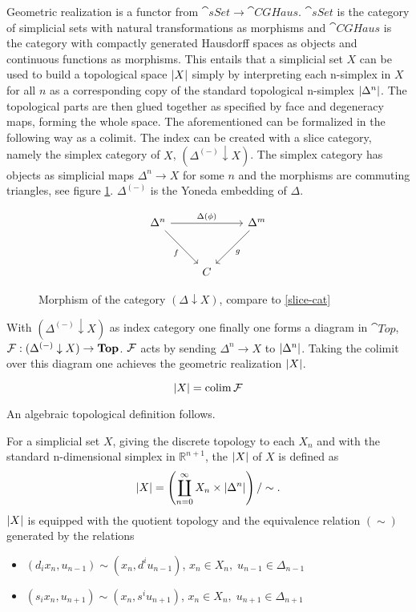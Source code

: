 \documentclass[../../main.tex]{subfiles}
\begin{document}
    Geometric realization is a functor from $\cat{sSet}\to \cat{CGHaus}$. $\cat{sSet}$ is the category of simplicial sets with natural transformations as morphisms and $\cat{CGHaus}$ is the category with compactly generated Hausdorff spaces as objects and continuous functions as morphisms. This entails that a simplicial set $X$ can be used to build a topological space $\geom[X]$ simply by interpreting each n-simplex in $X$ for all $n$ as a corresponding copy of the standard topological n-simplex $\geom[\Delta^n]$. The topological parts are then glued together as specified by face and degeneracy maps, forming the whole space. The aforementioned can be formalized in the following way as a colimit. The index can be created with a slice category, namely the simplex category of $X$, $(\Delta^{(-)} \downarrow X)$. The simplex category has objects as simplicial maps $\Delta^n\to X$ for some $n$ and the morphisms are commuting triangles, see figure \ref{commuting-tri}. $\Delta^{(-)}$ is the Yoneda embedding of $\Delta$. 
    
    \begin{figure}[H]
        \[
            \begin{tikzcd}[row sep = 3em]
                \Delta^n \arrow[rr,"\Delta(\phi)"] \arrow[dr, "f", swap] && \Delta^m \arrow[dl,"g"] \\
                & C
            \end{tikzcd}
        \]
        \caption{Morphism of the category $(\Delta \downarrow X)$, compare to \ref{slice-cat}}
        \label{commuting-tri}
    \end{figure}
    
    With $(\Delta^{(-)} \downarrow X)$ as index category one finally one forms a diagram in $\cat{Top}$, $\functor{F}:(\Delta^{(-)} \downarrow X) \to \cat{Top}$. $\functor{F}$ acts by sending $\Delta^n \to X$ to $\geom[\Delta^n]$. Taking the colimit over this diagram one achieves the geometric realization $\geom[X]$\cite{luk-simp}.
    
    \[\geom[X]= \mathrm{colim}\, \functor{F}\]

    An algebraic topological definition follows.

    \begin{definition}
        For a simplicial set $X$, giving the discrete topology to each $X_n$ and with the standard n-dimensional simplex in $\mathbb{R}^{n+1}$, the  $\geom[X]$ of $X$ is defined as
        \[\geom[X]=\left(\coprod_{n=0}^{\infty} X_n \times \geom[\Delta^n]\right)/\sim.\]
        $\geom[X]$ is equipped with the quotient topology and the equivalence relation $(\sim)$ generated by the relations 
        \begin{itemize}
            \item $(d_ix_{n},u_{n-1})\sim(x_{n}, d^iu_{n-1})$, $x_n\in X_n,\; u_{n-1} \in \Delta _{n-1}$
            \item $(s_ix_n, u_{n+1})\sim(x_n, s^iu_{n+1})$, $x_n \in X_n,\; u_{n+1}\in \Delta_{n+1}$
        \end{itemize}\label{geo-rel}
    \end{definition}
    
\end{document}
